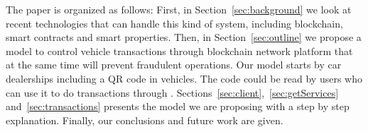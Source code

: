 The paper is organized as follows: 
First, in Section~\ref{sec:background}
we look at recent technologies that can handle this kind of system,
including blockchain, smart contracts and smart properties.
Then, in Section~\ref{sec:outline}
we propose a model to control vehicle transactions through blockchain network platform 
that at the same time will prevent fraudulent operations. 
Our model starts by car dealerships including a QR code in vehicles. 
The code could be read by users who can use it to do transactions through \blockchaincarnetwork. 
Sections~\ref{sec:client},~\ref{sec:getServices} and~\ref{sec:transactions} presents the model 
we are proposing with a step by step explanation. 
Finally, our conclusions and future work are given.